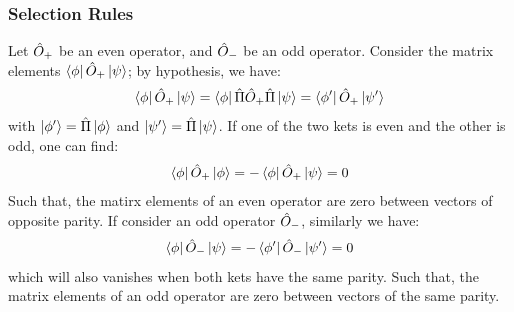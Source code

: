 \subsubsection{Selection Rules}
Let $\hat{O}_+$ be an even operator, and $\hat{O}_-$ be an odd operator. Consider the matrix elements $\bra{\phi} \hat{O}_+ \ket{\psi}$; by hypothesis, we have: 
\begin{align}
    \bra{\phi} \hat{O}_+ \ket{\psi} = \bra{\phi} \hat{\Pi} \hat{O}_+ \hat{\Pi} \ket{\psi} = \bra{\phi'} \hat{O}_+ \ket{\psi'}
\end{align}
with $\ket{\phi'} = \hat{\Pi} \ket{\phi}$ and $\ket{\psi'} = \hat{\Pi} \ket{\psi}$. If one of the two kets is even and the other is odd, one can find: 
\begin{align}
    \bra{\phi} \hat{O}_+ \ket{\phi} = - \bra{\phi} \hat{O}_+ \ket{\psi} = 0
\end{align}
Such that, the matirx elements of an even operator are zero between vectors of opposite parity.
If consider an odd operator $\hat{O}_-$, similarly we have:
\begin{align}
    \bra{\phi} \hat{O}_- \ket{\psi} = - \bra{\phi'} \hat{O}_- \ket{\psi'} =0
\end{align}
which will also vanishes when both kets have the same parity. Such that, the matrix elements of an odd operator are zero between vectors of the same parity.

























